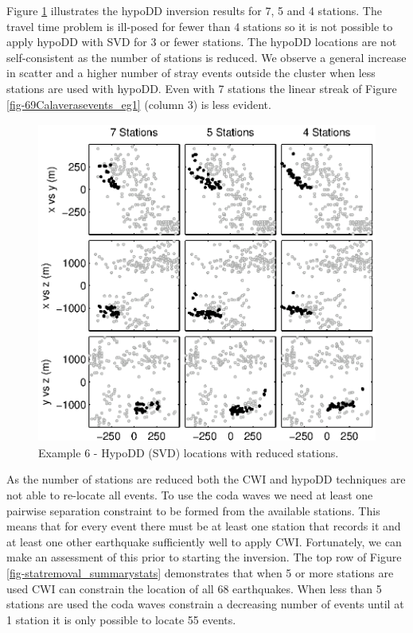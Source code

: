 \documentclass[extra]{gji}
\begin{document}
Figure \ref{fig-HYPODDreducesstats} illustrates the hypoDD inversion
results for 7, 5 and 4 stations. The travel time problem is
ill-posed for fewer than 4 stations so it is not possible to apply
hypoDD with SVD for 3 or fewer stations.  The hypoDD locations are
not self-consistent as the number of stations is reduced. We observe
a general increase in scatter and a higher number of stray events
outside the cluster when less stations are used with hypoDD. Even
with 7 stations the linear streak of Figure
\ref{fig-69Calaverasevents_eg1} (column 3) is less evident.


\begin{figure}
\includegraphics[height = 25pc]{diags/CalaverasLoc3_hypoDD_SVD.eps}
\caption{Example 6 - HypoDD (SVD) locations with reduced stations.}
\label{fig-HYPODDreducesstats}
\end{figure}


As the number of stations are reduced both the CWI and hypoDD
techniques are not able to re-locate all events. To use the coda
waves we need at least one pairwise separation constraint to be
formed from the available stations. This means that for every event
there must be at least one station that records it and at least one
other earthquake sufficiently well to apply CWI. Fortunately, we can
make an assessment of this prior to starting the inversion. The top
row of Figure \ref{fig-statremoval_summarystats} demonstrates that
when 5 or more stations are used CWI can constrain the location of
all 68 earthquakes. When less than 5 stations are used the coda
waves constrain a decreasing number of events until at 1 station it
is only possible to locate 55 events.
\end{document}
